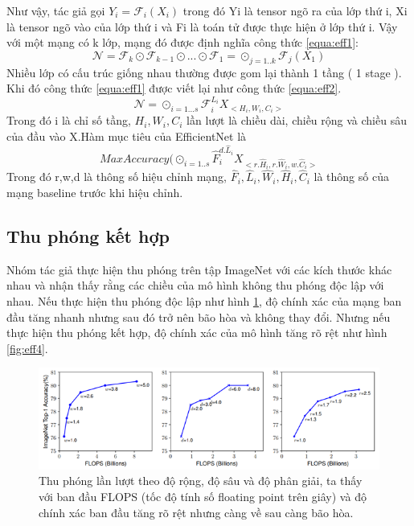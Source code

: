 Như vậy, tác giả gọi $Y_i=\mathcal{F}_i(X_i)$  trong đó Yi là tensor ngõ ra của lớp thứ i, Xi là tensor ngõ vào của lớp thứ i và Fi là toán tử được thực hiện ở lớp thứ i. Vậy với một mạng có k lớp, mạng đó được định nghĩa công thức \eqref{equa:eff1}:
\begin{equation}
\mathcal{N}= \mathcal{F}_k \odot \mathcal{F}_{k-1}\odot... \odot \mathcal{F}_1=\odot_{j=1..k} \mathcal{F}_j(X_1) \label{equa:eff1}
\end{equation}
Nhiều lớp có cấu trúc giống nhau thường được gom lại thành 1 tầng ( 1 stage ). Khi đó công thức \eqref{equa:eff1} được viết lại như công thức \eqref{equa:eff2}.
\begin{equation}
\mathcal{N}= \odot_{i=1...s} \mathcal{F}^{L_i}_iX_{<H_i,W_i,C_i>} \label{equa:eff2}
\end{equation}
Trong đó i là chỉ số tầng, $H_i,W_i,C_i$ lần lượt là chiều dài, chiều rộng và chiều sâu của đầu vào X.Hàm mục tiêu của EfficientNet là $$Max Accuracy(\odot_{i=1..s} \hat{F}_i^{d.\hat{L}_i} X_{<r.\hat{H}_i,r.\hat{W}_i,w.\hat{C}_i>}$$ Trong đó r,w,d là thông số hiệu chỉnh mạng, $\hat{F}_i,\hat{L}_i,\hat{W}_i,\hat{H}_i,\hat{C}_i$ là thông số của mạng baseline trước khi hiệu chỉnh.\par
\subsection{Thu phóng kết hợp}
Nhóm tác giả thực hiện thu phóng trên tập ImageNet với các kích thước khác nhau và nhận thấy rằng các chiều của mô hình không thu phóng độc lập với nhau. Nếu thực hiện thu phóng độc lập như hình \ref{fig:eff3}, độ chính xác của mạng ban đầu tăng nhanh nhưng sau đó trở nên bão hòa và không thay đổi. Nhưng nếu thực hiện thu phóng kết hợp, độ chính xác của mô hình tăng rõ rệt như hình \ref{fig:eff4}.\par
\begin{figure}[ht!]
\centerline{\includegraphics[scale=0.7]{images/eff3.png}}
\caption{Thu phóng lần lượt theo độ rộng, độ sâu và độ phân giải, ta thấy với ban đầu FLOPS (tốc độ tính số floating point trên giây) và độ chính xác ban đầu tăng rõ rệt nhưng càng về sau càng bão hòa\cite{efficientnet:2020}.}
\label{fig:eff3}
\end{figure}

